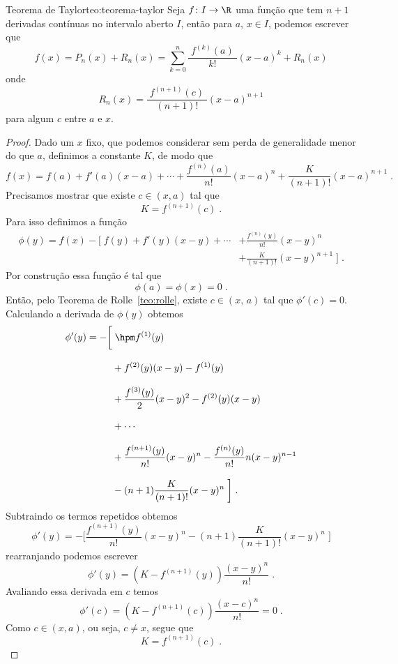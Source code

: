 \begin{teorema}{Teorema de Taylor}{teo:teorema-taylor}
  Seja%
  $f\colon I\rightarrow \R$ uma função que tem $n+1$ derivadas contínuas no
  intervalo aberto $I$, então para $a$, $x \in I$, podemos escrever que
  \[
    f(x) = P_n(x) + R_n(x)
         = \sum_{k=0}^n\frac{\;f^{(k)}(a)\;}{k!}(x-a)^k+ R_n(x)
  \]
  onde
  \[
    R_n(x)=\frac{\;f^{(n+1)}(c)\;}{(n+1)!}(x-a)^{n+1}
  \]
  para algum $c$ entre $a$ e $x$.
\end{teorema}
\begin{proof}
  Dado um $x$ fixo, que podemos considerar sem perda de generalidade menor do que $a$,
  definimos a constante $K$, de modo que
  \[
    f(x) = f(a)+f'(a)(x-a)
         + \cdots
         + \frac{f^{(n)}(a)}{n!}(x-a)^n
         + \frac{K}{(n+1)!}(x-a)^{n+1}    \;.
  \]
  Precisamos mostrar que existe $c\in(x, a)$ tal que
  \[
    K = f^{(n+1)}(c)    \;.
  \]
  Para isso definimos a função
  \begin{align*}
  	\phi(y) = f(x) - \bigg[\; f(y)   + f'(y)(x-y) + \cdots
  	                               & + \frac{f^{(n)}(y)}{n!}(x-y)^n        \\[2mm]
  	                               & +\frac{K}{(n+1)!}(x-y)^{n+1} \;\bigg]    \;.
  \end{align*}
  Por construção essa função é tal que
  \[
    \phi(a) = \phi(x) = 0    \;.
  \]
  Então, pelo Teorema de Rolle~\ref{teo:rolle},
  existe $c\in(x,\,a)$ tal que $\phi'(c)=0$.
  Calculando a derivada de $\phi(y)$ obtemos
  \begin{align*}
    \phi'(y) = -\bigg[ & \;\hpm f^{(1)}(y)                               \\[3mm]
                       & + f^{(2)}(y)(x-y) - f^{(1)}(y)                  \\[3mm]
                       & + \frac{f^{(3)}(y)}{2}(x-y)^2 - f^{(2)}(y)(x-y) \\[3mm]
                       & + \cdots                                        \\[3mm]
                       & + \frac{f^{(n+1)}(y)}{n!}   (x-y)^n
                         - \frac{f^{(n)  }(y)}{n!} n (x-y)^{n-1}         \\[3mm]
                       & -(n+1)\frac{K}{(n+1)!}(x-y)^{n}                 \;\bigg]    \;.
  \end{align*}
  Subtraindo os termos repetidos obtemos
  \[
    \phi'(y) = -\bigg[ \frac{f^{(n+1)}(y)}{n!}   (x-y)^n
                      -(n+1)\frac{K}{(n+1)!}(x-y)^{n}  \;\bigg]
  \]
  rearranjando podemos escrever
  \[
    \phi'(y) = \left(K - f^{(n+1)}(y)\right) \frac{(x-y)^{n}}{n!}    \;.
  \]
  Avaliando essa derivada em $c$ temos
  \[
    \phi'(c) = \left(K - f^{(n+1)}(c) \right) \frac{(x-c)^{n}}{n!} = 0    \;.
  \]
  Como $c\in(x, a)$, ou seja, $c\neq x$, segue que
  \[
    K = f^{(n+1)}(c)    \;.
  \]
\end{proof}


